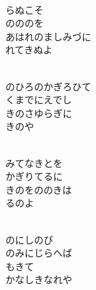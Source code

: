 \documentclass[10pt,b5j]{tarticle} %
\begin{document}
\vspace{1.5em} %
\newcommand{\linespace}{0.5em} %
\newcommand{\blocksize}{0.5\hsize} %
\newcommand{\itemmargin}{6em} %
\begin{enumerate} %
    \setlength{\itemindent}{\itemmargin} %
    \begin{minipage}[c]{\blocksize}
    
        \vspace{\linespace}
        \item~\\
        らぬこそ\\
        のののを\\
        あはれのましみづに\\
        れてきぬよ
        
        \vspace{\linespace}
        \item~\\
        のひろのかぎろひて\\
        くまでにえでし\\
        きのさゆらぎに\\
        きのや
        
        \vspace{\linespace}
        \item~\\
        みてなきとを\\
        かぎりてるに\\
        きのをののきは\\
        るのよ
        
        \vspace{\linespace}
        \item~\\
        のにしのび\\
        のみにじらへば\\
        もきて\\
        かなしきなれや
        

\end{minipage}
\end{enumerate}
\end{document}

